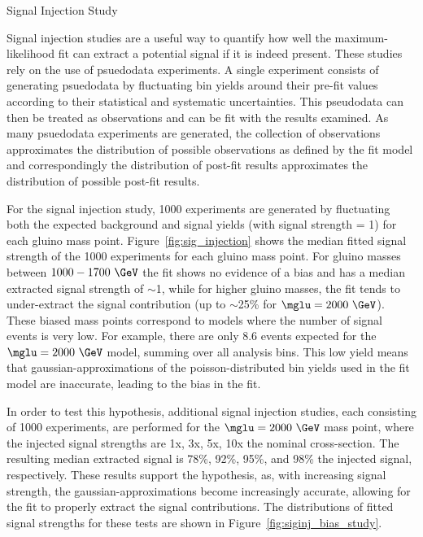 \begin{subsection}{Signal Injection Study}

Signal injection studies are a useful way to quantify how well the maximum-likelihood fit can extract a potential signal if it is indeed present.
These studies rely on the use of psuedodata experiments.
A single experiment consists of generating psuedodata by fluctuating bin yields around their pre-fit values according to their statistical and systematic uncertainties.
This pseudodata can then be treated as observations and can be fit with the results examined.
As many psuedodata experiments are generated, the collection of observations approximates the distribution of possible observations as defined by the fit model and correspondingly the distribution of post-fit results approximates the distribution of possible post-fit results.

For the signal injection study, 1000 experiments are generated by fluctuating both the expected background and signal yields (with signal strength = 1) for each gluino mass point.
Figure~\ref{fig:sig_injection} shows the median fitted signal strength of the 1000 experiments for each gluino mass point.
For gluino masses between $1000 - 1700~\GeV$ the fit shows no evidence of a bias and has a median extracted signal strength of $\sim$1, while for higher gluino masses, the fit tends to under-extract the signal contribution (up to $\sim$25\% for $\mglu = 2000~\GeV$).
These biased mass points correspond to models where the number of signal events is very low.
For example, there are only 8.6 events expected for the $\mglu = 2000~\GeV$ model, summing over all analysis bins.
This low yield means that gaussian-approximations of the poisson-distributed bin yields used in the fit model are inaccurate, leading to the bias in the fit.

In order to test this hypothesis, additional signal injection studies, each consisting of 1000 experiments, are performed for the $\mglu = 2000~\GeV$ mass point, where the injected signal strengths are 1x, 3x, 5x, 10x the nominal cross-section.
The resulting median extracted signal is 78\%, 92\%, 95\%, and 98\% the injected signal, respectively.
These results support the hypothesis, as, with increasing signal strength, the gaussian-approximations become increasingly accurate, allowing for the fit to properly extract the signal contributions.
The distributions of fitted signal strengths for these tests are shown in Figure~\ref{fig:siginj_bias_study}.


\end{subsection}
